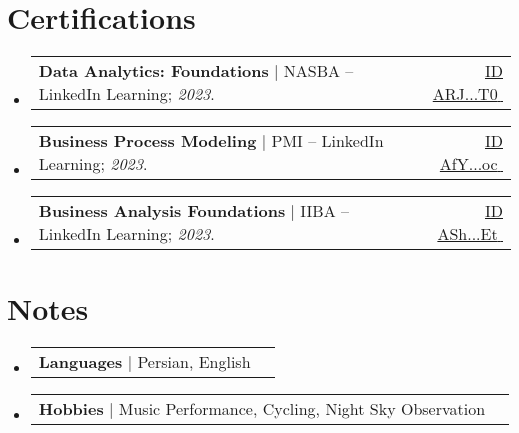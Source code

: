 \documentclass[11pt,a4paper]{article}
\makeatletter
\let\orighref\href
\renewcommand{\href}[2]{\orighref{#1}{#2\,{\textsuperscript{\tiny{\faExternalLink}}}}}
\newcommand{\deemph}[1]{{\color{black!40}#1}}
\newcommand{\resumeProjectHeading}[2]{
    \item
    \begin{tabular*}{0.97\textwidth}{l@{\extracolsep{\fill}}r}
      \small#1 & \deemph{#2} \\
    \end{tabular*}\vspace{-7pt}
}
\newcommand{\resumeSubHeadingListStart}{\begin{itemize}[leftmargin=0.15in, label={}]}
\newcommand{\resumeSubHeadingListEnd}{\end{itemize}}
\makeatother
\begin{document}
\begin{justify}
\section{Certifications}
    \resumeSubHeadingListStart
      \resumeProjectHeading
          {\textbf{Data Analytics: Foundations} $|$ NASBA -- LinkedIn Learning; \emph{2023}.}{\href{https://www.linkedin.com/learning/certificates/10c24841aac6b0c139f4971a8efd6d10356dc105124e31fa10eb32aa14ce3392}{\deemph{ID} \small{ARJ...T0}}}
      \resumeProjectHeading
          {\textbf{Business Process Modeling} $|$ PMI -- LinkedIn Learning; \emph{2023}.}{\href{https://www.linkedin.com/learning/certificates/3d1e244d9234631a908175486d19855434634d7f61cec316326ba4eb269bb041}{\deemph{ID} \small{AfY...oc}}}
      \resumeProjectHeading
          {\textbf{Business Analysis Foundations} $|$ IIBA -- LinkedIn Learning; \emph{2023}.}{\href{https://www.linkedin.com/learning/certificates/51dd265ef63b58255245c8f7438549551c92d30031e81b9ad864ee6994e1f6e6}{\deemph{ID} \small{ASh...Et}}}
          

    \resumeSubHeadingListEnd

\section{Notes}
    \resumeSubHeadingListStart

      \resumeProjectHeading{\textbf{Languages} $|$ Persian, English}{}
      \resumeProjectHeading{\textbf{Hobbies} $|$ Music Performance, Cycling, Night Sky Observation}{}

    \resumeSubHeadingListEnd
          

\end{justify}
\end{document}
